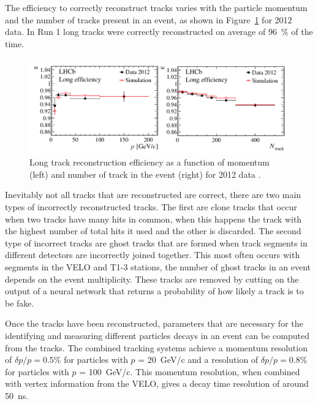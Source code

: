 The efficiency to correctly reconstruct tracks varies with the particle momentum and the number of tracks present in an event, as shown in Figure~\ref{fig:types_of_tracks} for 2012 data. In Run 1 long tracks were correctly reconstructed on average of 96~$\%$ of the time.





\begin{figure}[tb] 
  \centering    
  \includegraphics[width=1.0\textwidth]{./Figs/LHC_LHCb/LongTrack_efficiencies.png}
  \caption{Long track reconstruction efficiency as a function of momentum (left) and number of track in the event (right) for 2012 data \cite{Aaij:2014pwa}.}
  \label{fig:types_of_tracks}
\end{figure}




Inevitably not all tracks that are reconstructed are correct, there are two main types of incorrectly reconstructed tracks. The first are clone tracks that occur when two tracks have many hits in common, when this happens the track with the highest number of total hits it used and the other is discarded. The second type of incorrect tracks are ghost tracks that are formed when track segments in different detectors are incorrectly joined together. This most often occurs with segments in the VELO and T1-3 stations, the number of ghost tracks in an event depends on the event multiplicity. These tracks are removed by cutting on the output of a neural network that returns a probability of how likely a track is to be fake.



Once the tracks have been reconstructed, parameters that are necessary for the identifying and measuring different particles decays in an event can be computed from the tracks. The combined tracking systems achieve a momentum resolution of $\delta p / p = 0.5\%$ for particles with $p$ =  20~GeV/c and a resolution of $\delta p / p = 0.8\%$ for particles with $p$ =  100~GeV/c.  This momentum resolution, when combined with vertex information from the VELO, gives a decay time resolution of around 50~ns. 



